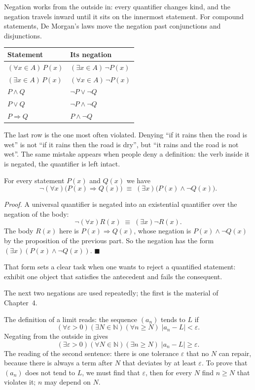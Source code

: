 Negation works from the outside in: every quantifier changes kind, and the negation travels inward
until it sits on the innermost statement. For compound statements, De Morgan's laws
move the negation past conjunctions and disjunctions.

{\centering
\begin{tabular}{ll}
\hline
Statement & Its negation \\
\hline
$(\forall x \in A)\,P(x)$ & $(\exists x \in A)\,\neg P(x)$ \\
$(\exists x \in A)\,P(x)$ & $(\forall x \in A)\,\neg P(x)$ \\
$P \wedge Q$ & $\neg P \vee \neg Q$ \\
$P \vee Q$ & $\neg P \wedge \neg Q$ \\
$P \Rightarrow Q$ & $P \wedge \neg Q$ \\
\hline
\end{tabular}\par}

The last row is the one most often violated. Denying ``if it rains then the road
is wet'' is not ``if it rains then the road is dry'', but ``it rains and the road is not
wet''. The same mistake appears when people deny a definition: the verb inside it is
negated, the quantifier is left intact.

\begin{proposisi}
For every statement $P(x)$ and $Q(x)$ we have
\[
  \neg(\forall x)\bigl(P(x) \Rightarrow Q(x)\bigr)
  \;\equiv\; (\exists x)\bigl(P(x) \wedge \neg Q(x)\bigr).
\]
\end{proposisi}
\par\smallskip\noindent\textit{Proof.} A universal quantifier is negated into an existential
quantifier over the negation of the body:
\[
  \neg(\forall x)R(x) \;\equiv\; (\exists x)\neg R(x).
\]
The body $R(x)$ here is $P(x) \Rightarrow Q(x)$, whose negation is $P(x) \wedge
\neg Q(x)$ by the proposition of the previous part. So the negation has the form
$(\exists x)(P(x) \wedge \neg Q(x))$.
\hfill$\blacksquare${\parfillskip=0pt\par}

That form sets a clear task when one wants to reject a quantified statement: exhibit
one object that satisfies the antecedent and fails the consequent.

The next two negations are used repeatedly; the first is the material of Chapter~4.

\begin{contoh}
The definition of a limit reads: the sequence $(a_{n})$ tends to $L$ if
\[
  (\forall \varepsilon > 0)(\exists N \in \mathbb{N})(\forall n \geq N)\;
  |a_{n} - L| < \varepsilon .
\]
Negating from the outside in gives
\[
  (\exists \varepsilon > 0)(\forall N \in \mathbb{N})(\exists n \geq N)\;
  |a_{n} - L| \geq \varepsilon .
\]
The reading of the second sentence: there is one tolerance $\varepsilon$ that no
$N$ can repair, because there is always a term after $N$ that deviates by at least
$\varepsilon$. To prove that $(a_{n})$ does not tend to $L$, we must find
that $\varepsilon$, then for every $N$ find $n \geq N$ that violates it; $n$ may
depend on $N$.
\end{contoh}

